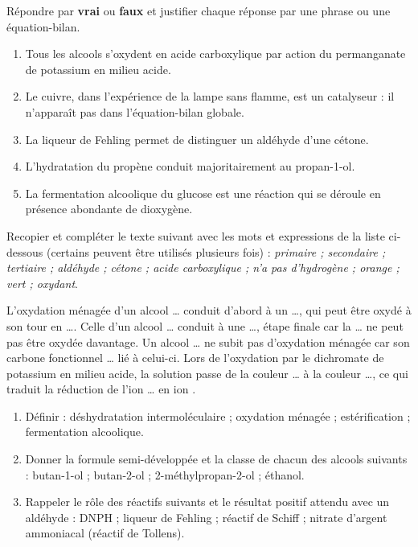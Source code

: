 \documentclass[11pt]{article}
\begin{document}
\begin{exercice}
Répondre par \textbf{vrai} ou \textbf{faux} et justifier chaque réponse par une phrase ou une équation-bilan.
\begin{enumerate}
\item Tous les alcools s'oxydent en acide carboxylique par action du permanganate de potassium en milieu acide.
\item Le cuivre, dans l'expérience de la lampe sans flamme, est un catalyseur : il n'apparaît pas dans l'équation-bilan globale.
\item La liqueur de Fehling permet de distinguer un aldéhyde d'une cétone.
\item L'hydratation du propène conduit majoritairement au propan-1-ol.
\item La fermentation alcoolique du glucose est une réaction qui se déroule en présence abondante de dioxygène.
\end{enumerate}
\end{exercice}

\begin{exercice}
Recopier et compléter le texte suivant avec les mots et expressions de la liste ci-dessous (certains peuvent être utilisés plusieurs fois) : \emph{primaire ; secondaire ; tertiaire ; aldéhyde ; cétone ; acide carboxylique ; n'a pas d'hydrogène ; orange ; vert ; oxydant}.

L'oxydation ménagée d'un alcool \ldots{} conduit d'abord à un \ldots{}, qui peut être oxydé à son tour en \ldots{}. Celle d'un alcool \ldots{} conduit à une \ldots{}, étape finale car la \ldots{} ne peut pas être oxydée davantage. Un alcool \ldots{} ne subit pas d'oxydation ménagée car son carbone fonctionnel \ldots{} lié à celui-ci. Lors de l'oxydation par le dichromate de potassium en milieu acide, la solution passe de la couleur \ldots{} à la couleur \ldots{}, ce qui traduit la réduction de l'ion \ldots{}  en ion .
\end{exercice}

\begin{exercice}
\begin{enumerate}
\item Définir : déshydratation intermoléculaire ; oxydation ménagée ; estérification ; fermentation alcoolique.
\item Donner la formule semi-développée et la classe de chacun des alcools suivants : butan-1-ol ; butan-2-ol ; 2-méthylpropan-2-ol ; éthanol.
\item Rappeler le rôle des réactifs suivants et le résultat positif attendu avec un aldéhyde : DNPH ; liqueur de Fehling ; réactif de Schiff ; nitrate d'argent ammoniacal (réactif de Tollens).
\end{enumerate}
\end{exercice}
\end{document}

